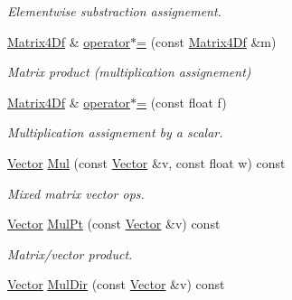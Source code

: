 \begin{DoxyCompactItemize}
\begin{DoxyCompactList}\small\item\em \-Elementwise substraction assignement. \end{DoxyCompactList}\item 
\hypertarget{class_matrix4_df_a640aaeab5bd481cb386b4215a96e9b11}{
\hyperlink{class_matrix4_df}{\-Matrix4\-Df} \& \hyperlink{class_matrix4_df_a640aaeab5bd481cb386b4215a96e9b11}{operator$\ast$=} (const \hyperlink{class_matrix4_df}{\-Matrix4\-Df} \&m)}
\label{class_matrix4_df_a640aaeab5bd481cb386b4215a96e9b11}

\begin{DoxyCompactList}\small\item\em \-Matrix product (multiplication assignement) \end{DoxyCompactList}\item 
\hypertarget{class_matrix4_df_a9b55ffcbb7a04cf4be18d94f353de640}{
\hyperlink{class_matrix4_df}{\-Matrix4\-Df} \& \hyperlink{class_matrix4_df_a9b55ffcbb7a04cf4be18d94f353de640}{operator$\ast$=} (const float f)}
\label{class_matrix4_df_a9b55ffcbb7a04cf4be18d94f353de640}

\begin{DoxyCompactList}\small\item\em \-Multiplication assignement by a scalar. \end{DoxyCompactList}\item 
\hypertarget{class_matrix4_df_a664d6f9bba8780ed3e1d95e963415035}{
\hyperlink{class_vector}{\-Vector} \hyperlink{class_matrix4_df_a664d6f9bba8780ed3e1d95e963415035}{\-Mul} (const \hyperlink{class_vector}{\-Vector} \&v, const float w) const }
\label{class_matrix4_df_a664d6f9bba8780ed3e1d95e963415035}

\begin{DoxyCompactList}\small\item\em \-Mixed matrix vector ops. \end{DoxyCompactList}\item 
\hypertarget{class_matrix4_df_adc095474932b5b365bbd146d9be18577}{
\hyperlink{class_vector}{\-Vector} \hyperlink{class_matrix4_df_adc095474932b5b365bbd146d9be18577}{\-Mul\-Pt} (const \hyperlink{class_vector}{\-Vector} \&v) const }
\label{class_matrix4_df_adc095474932b5b365bbd146d9be18577}

\begin{DoxyCompactList}\small\item\em \-Matrix/vector product. \end{DoxyCompactList}\item 
\hypertarget{class_matrix4_df_adfe24f1ecc992078c6408c4ebf8d6377}{
\hyperlink{class_vector}{\-Vector} \hyperlink{class_matrix4_df_adfe24f1ecc992078c6408c4ebf8d6377}{\-Mul\-Dir} (const \hyperlink{class_vector}{\-Vector} \&v) const }
\label{class_matrix4_df_adfe24f1ecc992078c6408c4ebf8d6377}


\end{DoxyCompactItemize}
